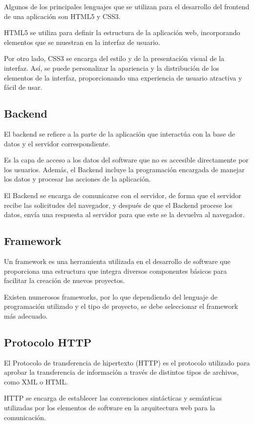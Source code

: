 Algunos de los principales lenguajes que se utilizan para el desarrollo del frontend de una aplicación son HTML5 y CSS3.

HTML5 se utiliza para definir la estructura de la aplicación web, incorporando elementos que se muestran en la interfaz de usuario. 

Por otro lado, CSS3 se encarga del estilo y de la presentación visual de la interfaz. Así, se puede personalizar la apariencia y la distribución de los elementos de la interfaz, proporcionando una experiencia de usuario atractiva y fácil de usar.

\subsection{Backend}
\cite{frontendybackend} El backend se refiere a la parte de la aplicación que interactúa con la base de datos y el servidor correspondiente. 

Es la capa de acceso a los datos del software que no es accesible directamente por los usuarios. Además, el Backend incluye la programación encargada de manejar los datos y procesar las acciones de la aplicación. 

\cite{backend} El Backend se encarga de comunicarse con el servidor, de forma que el servidor recibe las solicitudes del navegador, y después de que el Backend procese los datos, envía una respuesta al servidor para que este se la devuelva al navegador.

\subsection{Framework}
\cite{framework} Un framework es una herramienta utilizada en el desarrollo de software que proporciona una estructura que integra diversos componentes básicos para facilitar la creación de nuevos proyectos. 

Existen numerosos frameworks, por lo que dependiendo del lenguaje de programación utilizado y el tipo de proyecto, se debe seleccionar el framework más adecuado.

\subsection{Protocolo HTTP}
\cite{http} El Protocolo de transferencia de hipertexto (HTTP) es el protocolo utilizado para aprobar la transferencia de información a través de distintos tipos de archivos, como XML o HTML.

HTTP se encarga de establecer las convenciones sintácticas y semánticas utilizadas por los elementos de software en la arquitectura web para la comunicación. 

